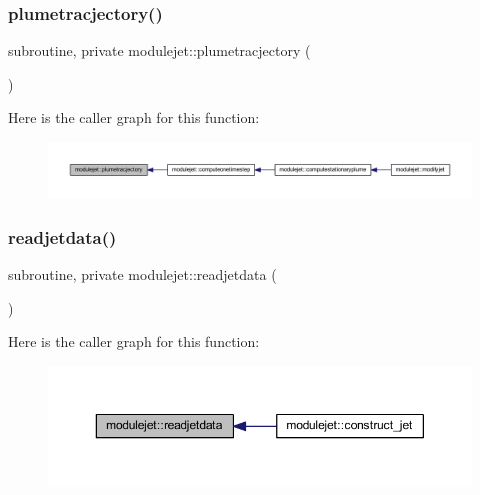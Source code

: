 \subsubsection{\texorpdfstring{plumetracjectory()}{plumetracjectory()}}
{\footnotesize\ttfamily subroutine, private modulejet\+::plumetracjectory (\begin{DoxyParamCaption}{ }\end{DoxyParamCaption})\hspace{0.3cm}{\ttfamily [private]}}

Here is the caller graph for this function\+:\nopagebreak
\begin{figure}[H]
\begin{center}
\leavevmode
\includegraphics[width=350pt]{namespacemodulejet_a9175197cbe465e40fa03bc6a7c788871_icgraph}
\end{center}
\end{figure}
\mbox{\label{namespacemodulejet_ad99b3da948112f106201831bbaaa074f}} 
\subsubsection{\texorpdfstring{readjetdata()}{readjetdata()}}
{\footnotesize\ttfamily subroutine, private modulejet\+::readjetdata (\begin{DoxyParamCaption}{ }\end{DoxyParamCaption})\hspace{0.3cm}{\ttfamily [private]}}

Here is the caller graph for this function\+:\nopagebreak
\begin{figure}[H]
\begin{center}
\leavevmode
\includegraphics[width=350pt]{namespacemodulejet_ad99b3da948112f106201831bbaaa074f_icgraph}
\end{center}
\end{figure}
\mbox{\label{namespacemodulejet_a08cf17884b67eb6e393c3f7553f6398f}} 
